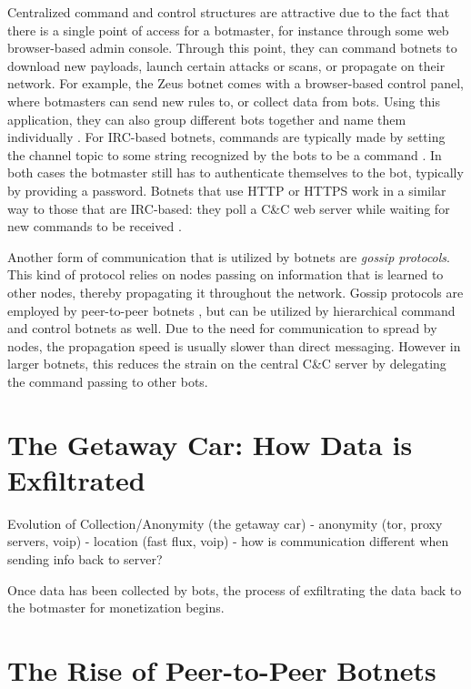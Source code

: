 \documentclass{acm_proc_article-sp}
\begin{document}
Centralized command and control structures are attractive due to the fact that there is a single point of access for a botmaster, for instance through some web browser-based admin console. Through this point, they can command botnets to download new payloads, launch certain attacks or scans, or propagate on their network. For example, the Zeus botnet comes with a browser-based control panel, where botmasters can send new rules to, or collect data from bots. Using this application, they can also group different bots together and name them individually \cite{blackhat:zeus}. For IRC-based botnets, commands are typically made by setting the channel topic to some string recognized by the bots to be a command \cite{honeynet-appendix}. In both cases the botmaster still has to authenticate themselves to the bot, typically by providing a password. Botnets that use HTTP or HTTPS work in a similar way to those that are IRC-based: they poll a C\&C web server while waiting for new commands to be received \cite{borgaonkar:analysis}.

Another form of communication that is utilized by botnets are \emph{gossip protocols}. This kind of protocol relies on nodes passing on information that is learned to other nodes, thereby propagating it throughout the network. Gossip protocols are employed by peer-to-peer botnets \cite{defcon:prowling}, but can be utilized by hierarchical command and control botnets as well. Due to the need for communication to spread by nodes, the propagation speed is usually slower than direct messaging. However in larger botnets, this reduces the strain on the central C\&C server by delegating the command passing to other bots.


\section{The Getaway Car: How Data is Exfiltrated}
Evolution of Collection/Anonymity (the getaway car)
    - anonymity (tor, proxy servers, voip)
    - location (fast flux, voip)
    - how is communication different when sending info back to server?

Once data has been collected by bots, the process of exfiltrating the data back to the botmaster for monetization begins.  


\section{The Rise of Peer-to-Peer Botnets}
\end{document}
